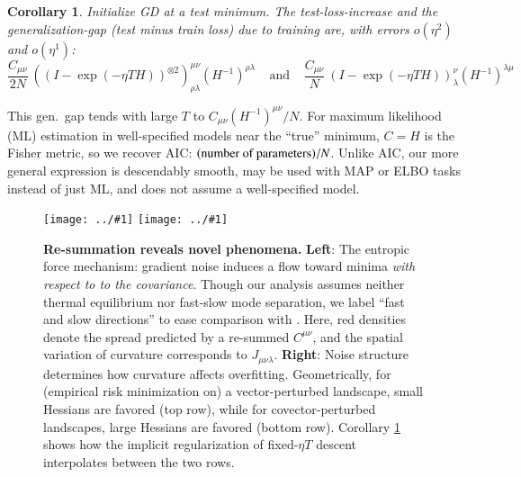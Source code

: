 \documentclass{article}
\theoremstyle{plain}
\newtheorem{cor}{Corollary}
\theoremstyle{definition}
\newcommand{\wrap}[1]{\left(#1\right)}
\newcommand{\rvalue}{\text{\textnormal{rvalue}}}
\newcommand{\plotmooh}[3]{\texttt{[image: ../\#1]}}
\newcommand{\sizeddia}[2]{
    \begin{gathered}
        \texttt{[image: ../diagrams/\#1.png]}
    \end{gathered}
}
\newcommand{\sdia}[1]{\protect \sizeddia{#1}{0.10}}
\begin{document}
        \begin{cor}\label{cor:overfit}
            Initialize GD at a test minimum.  The test-loss-increase and the
            generalization-gap (test minus train loss) due to training are,
            with errors $o(\eta^2)$ and $o(\eta^1)$:
            $$
                \frac{C_{\mu\nu}}{2N} ~
                    \wrap{(I - \exp(-\eta T H))^{\otimes 2}}^{\mu\nu}_{\rho\lambda}
                    \wrap{H^{-1}}^{\rho\lambda}
                ~~~~~ \text{and} ~~~~~
                \frac{C_{\mu\nu}}{N} ~
                    \wrap{I - \exp(-\eta T H)}^{\nu}_{\lambda}
                    \wrap{H^{-1}}^{\lambda\mu}
            $$
        \end{cor}
        This gen.\ gap tends with large $T$ 
        to $C_{\mu\nu}(H^{-1})^{\mu\nu}/N$.  For maximum
        likelihood (ML) estimation in well-specified models near the ``true''
        minimum, $C=H$ is the Fisher metric, so we recover AIC:
        $(\textnormal{number of parameters})/N$.  Unlike AIC, our more general
        expression is descendably smooth, may be used with MAP or ELBO tasks
        instead of just ML, and does not assume a well-specified model.

        \begin{figure}[h!]
            \centering
            \plotmooh{diagrams/entropic-force-diagram}{}{0.32\columnwidth} 
            \plotmooh{diagrams/sharp}{}{0.31\columnwidth}
            \caption{
                {\bf Re-summation reveals novel phenomena.}
                {\bf Left}:
                    The entropic force mechanism: gradient noise induces a flow
                    toward minima  \emph{with respect to to the
                    covariance}.  Though our analysis assumes neither thermal
                    equilibrium nor fast-slow mode separation, we label ``fast
                    and slow directions'' to ease comparison
                    with \cite{we19b}.  Here, red densities denote
                    the spread predicted by a re-summed $C^{\mu\nu}$, and
                    the spatial variation of curvature corresponds to
                    $J_{\mu\nu\lambda}$. 
                {\bf Right}:
                    Noise structure determines how curvature affects
                    overfitting.  Geometrically, for (empirical risk
                    minimization on) a vector-perturbed landscape, small
                    Hessians are favored (top row), while for
                    covector-perturbed landscapes, large Hessians are favored
                    (bottom row).  Corollary \ref{cor:overfit} shows how the
                    implicit regularization of fixed-$\eta T$ descent interpolates 
                    between the two rows.
            }
            \label{fig:cubicandspring}
        \end{figure}
\end{document}
